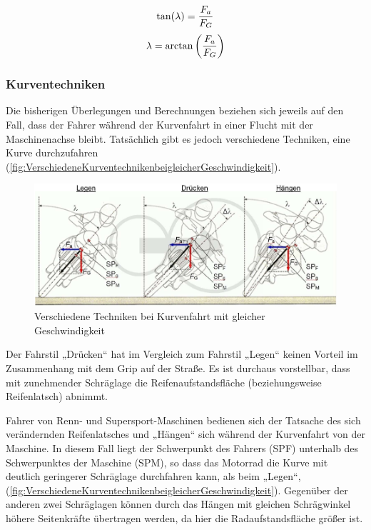 \begin{align*}
	\centering
	\tan(\lambda)  =  \frac{F_a}{F_G}
\end{align*}
\begin{align}
	\centering
	\lambda  =  \arctan \left(\frac{F_a}{F_G}\right)
	\label{gl:Schraegwinkel}
\end{align}





\subsubsection{Kurventechniken}
Die bisherigen Überlegungen und Berechnungen beziehen sich jeweils auf den Fall, dass der Fahrer während der Kurvenfahrt in einer Flucht mit der Maschinenachse bleibt. Tatsächlich gibt es jedoch verschiedene Techniken, eine Kurve durchzufahren (\autoref{fig:VerschiedeneKurventechnikenbeigleicherGeschwindigkeit}).
\begin{figure}[htpb]
	\centering
	\includegraphics[width=\linewidth]{Bilder/VerschiedeneKurventechnikenbeigleicherGeschwindigkeit_pdf.pdf}
	\caption{Verschiedene Techniken bei Kurvenfahrt mit gleicher Geschwindigkeit \citep{Haedrich2012}}
	\label{fig:VerschiedeneKurventechnikenbeigleicherGeschwindigkeit}
\end{figure}

Der Fahrstil „Drücken“ hat im Vergleich zum Fahrstil „Legen“ keinen Vorteil im Zusammenhang mit dem Grip auf der Straße. Es ist durchaus vorstellbar, dass mit zunehmender Schräglage die Reifenaufstandsfläche (beziehungsweise Reifenlatsch) abnimmt.

Fahrer von Renn- und Supersport-Maschinen bedienen sich der Tatsache des sich verändernden Reifenlatsches und „Hängen“ sich während der Kurvenfahrt von der Maschine. In diesem Fall liegt der Schwerpunkt des Fahrers (SPF) unterhalb des Schwerpunktes der Maschine (SPM), so dass das Motorrad die Kurve mit deutlich geringerer Schräglage durchfahren kann, als beim „Legen“, (\autoref{fig:VerschiedeneKurventechnikenbeigleicherGeschwindigkeit}). Gegenüber der anderen zwei Schräglagen können durch das \glqq Hängen\grqq{} mit gleichen Schrägwinkel höhere Seitenkräfte übertragen werden, da hier die Radaufstandsfläche größer ist.



